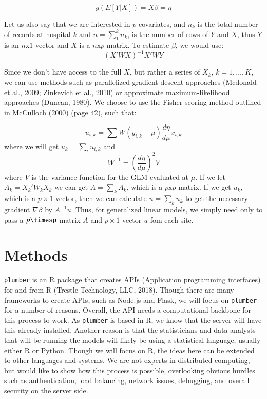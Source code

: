 \documentclass[]{elsarticle} %
\begin{document}
\[
g(E[Y | X]) = X\beta = \eta
\]

Let us also say that we are interested in \(p\) covariates, and
\(n_{k}\) is the total number of records at hospital \(k\) and
\(n = \sum_{1}^{k} n_{k}\), is the number of rows of \(Y\) and \(X\),
thus \(Y\) is an \(n\text{x}1\) vector and \(X\) is a \(n\text{x}p\)
matrix. To estimate \(\beta\), we would use: \[
(X'WX)^{-1} X'WY
\]

Since we don't have access to the full \(X\), but rather a series of
\(X_{k}\), \(k = 1, \dots, K\), we can use methods such as parallelized
gradient descent approaches (Mcdonald et al., 2009; Zinkevich et al.,
2010) or approximate maximum-likelihood approaches (Duncan, 1980). We
choose to use the Fisher scoring method outlined in McCulloch (2000)
(page 42), such that:

\[
u_{i,k} = \sum W (y_{i,k} - \mu) \frac{d\eta}{d\mu}x_{i,k}
\] where we will get \(u_{k} = \sum_{i} u_{i, k}\) and \[
W^{-1} = \left(\frac{d\eta}{d\mu}\right)^2V
\] where \(V\) is the variance function for the GLM evaluated at
\(\mu\). If we let \(A_{k} = X_k'W_kX_k\) we can get
\(A = \sum_{k}A_{k}\), which is a \(p\text{x}p\) matrix. If we get
\(u_{k}\), which is a \(p\times 1\) vector, then we can calculate
\(u = \sum_{k} u_{k}\) to get the necessary gradient \(\nabla\beta\) by
\(A^{-1} u\). Thus, for generalized linear models, we simply need only
to pass a \(p\timesp\) matrix \(A\) and \(p\times{1}\) vector \(u\) fom
each site.

\hypertarget{methods}{%
\section{Methods}\label{methods}}

\texttt{plumber} is an R package that creates APIs (Application
programming interfaces) for and from R (Trestle Technology, LLC, 2018).
Though there are many frameworks to create APIs, such as Node.js and
Flask, we will focus on \texttt{plumber} for a number of reasons.
Overall, the API needs a computational backbone for this process to
work. As \texttt{plumber} is based in R, we know that the server will
have this already installed. Another reason is that the statisticians
and data analysts that will be running the models will likely be using a
statistical language, usually either R or Python. Though we will focus
on R, the ideas here can be extended to other languages and systems. We
are not experts in distributed computing, but would like to show how
this process is possible, overlooking obvious hurdles such as
authentication, load balancing, network issues, debugging, and overall
security on the server side.
\end{document}

